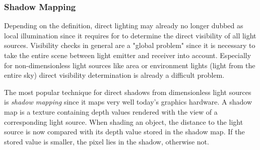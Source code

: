 \documentclass[thesis.tex]{subfiles}
\begin{document}
\subsubsection{Shadow Mapping}
Depending on the definition, direct lighting may already no longer dubbed as local illumination since it requires for to determine the direct visibility of all light sources. 
Visibility checks in general are a "global problem" since it is necessary to take the entire scene between light emitter and receiver into account.
Especially for non-dimensionless light sources like area or environment lights (light from the entire sky) direct visibility determination is already a difficult problem.

The most popular technique for direct shadows from dimensionless light sources is \emph{shadow mapping} \cite{bib:shadowmapping} since it maps very well today's graphics hardware.
A shadow map is a texture containing depth values rendered with the view of a corresponding light source.
When shading an object, the distance to the light source is now compared with its depth value stored in the shadow map.
If the stored value is smaller, the pixel lies in the shadow, otherwise not.
\end{document}
